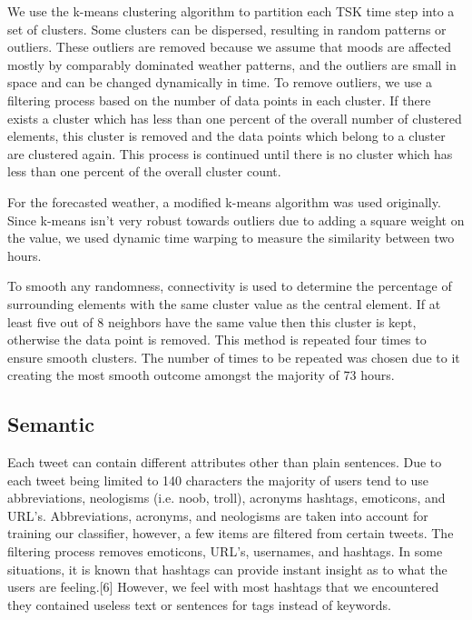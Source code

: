 We use the k-means clustering algorithm to partition each TSK time step into a set of clusters. Some clusters can be dispersed, resulting in random patterns or outliers. These outliers are removed because we assume that moods are affected mostly by comparably dominated weather patterns, and the outliers are small in space and can be changed dynamically in time. To remove outliers, we use a filtering process based on the number of data points in each cluster. If there exists a cluster which has less than one percent of the overall number of clustered elements, this cluster is removed and the data points which belong to a cluster are clustered again. This process is continued until there is no cluster which has less than one percent of the overall cluster count. %



For the forecasted weather, a modified k-means algorithm was used originally. Since k-means isn't very robust towards outliers due to adding a square weight on the value, we used dynamic time warping to measure the similarity between two hours.

To smooth any randomness, connectivity is used to determine the percentage of surrounding elements with the same cluster value as the central element. If at least five out of 8 neighbors have the same value then this cluster is kept, otherwise the data point is removed. This method is repeated four times to ensure smooth clusters. The number of times to be repeated was chosen due to it creating the most smooth outcome amongst the majority of 73 hours.

\subsection{Semantic}
\label{sec:senti}

Each tweet can contain different attributes other than plain sentences. Due to each tweet being limited to 140 characters the majority of users tend to use abbreviations, neologisms (i.e. noob, troll), acronyms hashtags, emoticons, and URL's. Abbreviations, acronyms, and neologisms are taken into account for training our classifier, however, a few items are filtered from certain tweets. The filtering process removes  emoticons, URL's, usernames, and hashtags. In some situations, it is known that hashtags can provide instant insight as to what the users are feeling.[6] However, we feel with most hashtags that we encountered they contained useless text or sentences for tags instead of keywords.

